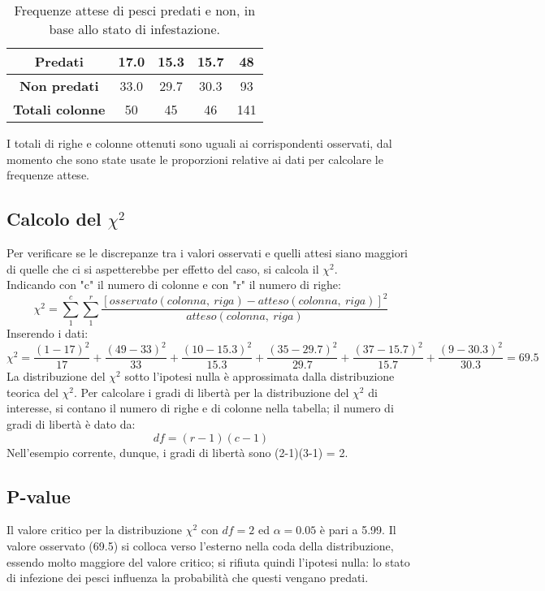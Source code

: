 \documentclass[drafts, 10pt]{book}
\newcounter{example}[section]
\begin{document}
\begin{example}
\begin{table}[H]
\begin{tabular}{c|c|c|c|c}
    \hline
    \textbf{Predati} & 17.0 & 15.3 & 15.7 & 48\\
    \hline
    \textbf{Non predati} & 33.0 & 29.7 & 30.3 & 93\\
    \hline
    \textbf{Totali colonne} & 50 & 45 & 46 & 141\\
    \hline
    \end{tabular}
    \caption{\small{Frequenze attese di pesci predati e non, in base allo stato di infestazione.}}
    \label{tabparassitosi2}
\end{table}\noindent
I totali di righe e colonne ottenuti sono uguali ai corrispondenti osservati, dal momento che sono state usate le proporzioni relative ai dati per calcolare le frequenze attese.

\subsection{Calcolo del \texorpdfstring{$\chi^2$}{Lg}}
Per verificare se le discrepanze tra i valori osservati e quelli attesi siano maggiori di quelle che ci si aspetterebbe per effetto del caso, si calcola il $\chi^2$.
\\
Indicando con "c" il numero di colonne e con "r" il numero di righe:
\begin{equation}
    \chi^2 = \sum^c_1 \sum^r_1 \frac{[osservato(colonna,\ riga)- atteso(colonna,\ riga)]^2}{atteso(colonna,\ riga)}
\end{equation}
Inserendo i dati:
\begin{equation}
    \chi^2 = \frac{(1-17)^2}{17}+\frac{(49-33)^2}{33}+\frac{(10-15.3)^2}{15.3}+\frac{(35-29.7)^2}{29.7}+\frac{(37-15.7)^2}{15.7}+\frac{(9-30.3)^2}{30.3} = 69.5
\end{equation}
La distribuzione del $\chi^2$ sotto l'ipotesi nulla è approssimata dalla distribuzione teorica del $\chi^2$. Per calcolare i gradi di libertà per la distribuzione del $\chi^2$ di interesse, si contano il numero di righe e di colonne nella tabella; il numero di gradi di libertà è dato da:
\begin{equation}
    df = (r-1)(c-1)
\end{equation}
Nell'esempio corrente, dunque, i gradi di libertà sono (2-1)(3-1) = 2.

\subsection{P-value}

Il valore critico per la distribuzione $\chi^2$ con $df = 2$ ed $\alpha = 0.05$ è pari a 5.99. Il valore osservato (69.5) si colloca verso l'esterno nella coda della distribuzione, essendo molto maggiore del valore critico; si rifiuta quindi l'ipotesi nulla: lo stato di infezione dei pesci influenza la probabilità che questi vengano predati.
\end{example}
\end{document}
